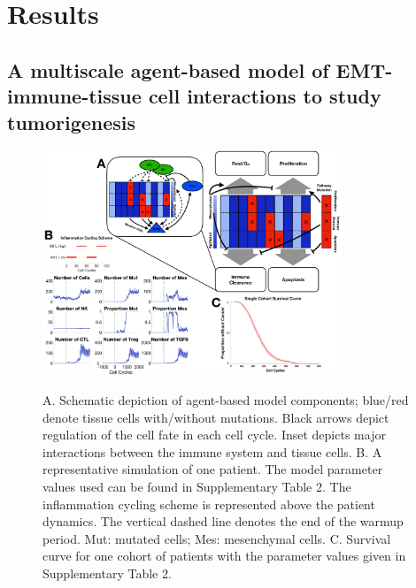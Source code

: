 \documentclass[11pt]{article}
\newcommand{\tcr} { \textcolor{red} }
\begin{document}

\section{Results}

\subsection{A multiscale agent-based model of EMT-immune-tissue cell interactions to study tumorigenesis}\label{ExplModel}

\begin{figure}
\center
{\includegraphics[width=0.8\textwidth]{Figure1/Figure1.pdf}}
\caption{A. Schematic depiction of agent-based model components; blue/red denote tissue cells with/without mutations. Black arrows depict regulation of the cell fate in each cell cycle. Inset depicts major interactions between the immune system and tissue cells.
B. A representative simulation of one patient. The model parameter values used can be found in Supplementary Table 2. 
The inflammation cycling scheme is represented above the patient dynamics. The vertical dashed line denotes the end of the warmup period. Mut: mutated cells; Mes: mesenchymal cells. 
C. Survival curve for one cohort of patients with the parameter values given in Supplementary Table 2. }
\label{fig:ModelIntro}
\end{figure}
\end{document}
